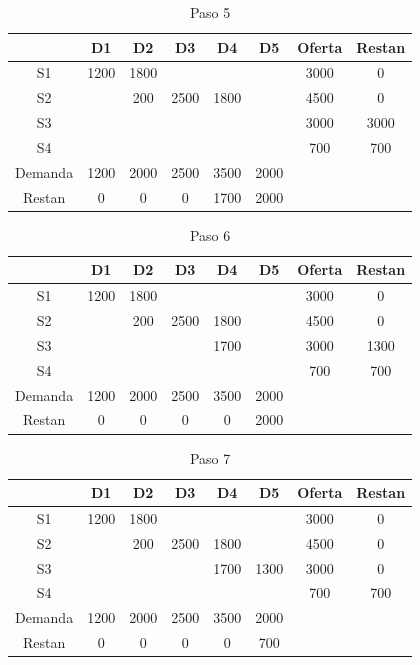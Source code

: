 \documentclass[12pt]{article}  %
\begin{document}
\begin{table}[H]
\centering
\caption{Paso 5}
\label{tab:Paso5Prob5}
\begin{tabular}{c|ccccc|cc}
& D1 & D2 & D3 & D4 & D5 & Oferta & Restan\\
\hline
S1 & 1200 & 1800 &  &  &  & 3000 & 0 \\
S2 &  & 200 & 2500 & \cellcolor{yellow}1800 &  & 4500 & 0 \\
S3 &  &  &  &  &  & 3000 & 3000 \\
S4 &  &  &  &  &  & 700 &700 \\
\hline
Demanda & 1200 & 2000 & 2500 & 3500 & 2000 & & \\
Restan & 0 & 0 & 0 & 1700 & 2000 &&
\end{tabular}
\end{table}

\begin{table}[H]
\centering
\caption{Paso 6}
\label{tab:Paso6Prob5}
\begin{tabular}{c|ccccc|cc}
& D1 & D2 & D3 & D4 & D5 & Oferta & Restan\\
\hline
S1 & 1200 & 1800 &  &  &  & 3000 & 0 \\
S2 &  & 200 & 2500 & 1800 &  & 4500 & 0 \\
S3 &  &  &  & \cellcolor{yellow}1700 &  & 3000 & 1300 \\
S4 &  &  &  &  &  & 700 &700 \\
\hline
Demanda & 1200 & 2000 & 2500 & 3500 & 2000 & & \\
Restan & 0 & 0 & 0 & 0 & 2000 &&
\end{tabular}
\end{table}

\begin{table}[H]
\centering
\caption{Paso 7}
\label{tab:Paso7Prob5}
\begin{tabular}{c|ccccc|cc}
& D1 & D2 & D3 & D4 & D5 & Oferta & Restan\\
\hline
S1 & 1200 & 1800 &  &  &  & 3000 & 0 \\
S2 &  & 200 & 2500 & 1800 &  & 4500 & 0 \\
S3 &  &  &  & 1700 & \cellcolor{yellow}1300 & 3000 & 0 \\
S4 &  &  &  &  &  & 700 &700 \\
\hline
Demanda & 1200 & 2000 & 2500 & 3500 & 2000 & & \\
Restan & 0 & 0 & 0 & 0 & 700 &&
\end{tabular}
\end{table}
\end{document}
